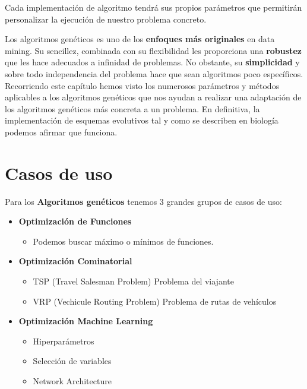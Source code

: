 \documentclass[
  a4paper,
  DIV=11,
  numbers=noendperiod]{scrreprt}
\providecommand{\tightlist}{%
  \setlength{\itemsep}{0pt}\setlength{\parskip}{0pt}}\usepackage{longtable,booktabs,array}
\begin{document}
Cada implementación de algoritmo tendrá sus propios parámetros que
permitirán personalizar la ejecución de nuestro problema concreto.

\begin{tcolorbox}[enhanced jigsaw, title=\textcolor{quarto-callout-important-color}{\faExclamation}\hspace{0.5em}{Recordad}, toprule=.15mm, breakable, opacityback=0, rightrule=.15mm, arc=.35mm, bottomrule=.15mm, toptitle=1mm, colframe=quarto-callout-important-color-frame, colbacktitle=quarto-callout-important-color!10!white, colback=white, coltitle=black, opacitybacktitle=0.6, bottomtitle=1mm, titlerule=0mm, leftrule=.75mm, left=2mm]

Los algoritmos genéticos es uno de los \textbf{enfoques más originales}
en data mining. Su sencillez, combinada con su flexibilidad les
proporciona una \textbf{robustez} que les hace adecuados a infinidad de
problemas. No obstante, su \textbf{simplicidad} y sobre todo
independencia del problema hace que sean algoritmos poco específicos.
Recorriendo este capítulo hemos visto los numerosos parámetros y métodos
aplicables a los algoritmos genéticos que nos ayudan a realizar una
adaptación de los algoritmos genéticos más concreta a un problema. En
definitiva, la implementación de esquemas evolutivos tal y como se
describen en biología podemos afirmar que funciona.

\end{tcolorbox}

\section{Casos de uso}\label{casos-de-uso-1}

Para los \textbf{Algoritmos genéticos} tenemos 3 grandes grupos de casos
de uso:

\begin{itemize}
\tightlist
\item
  \textbf{Optimización de Funciones}

  \begin{itemize}
  \tightlist
  \item
    Podemos buscar máximo o mínimos de funciones.
  \end{itemize}
\item
  \textbf{Optimización Cominatorial}

  \begin{itemize}
  \tightlist
  \item
    TSP (Travel Salesman Problem) Problema del viajante
  \item
    VRP (Vechicule Routing Problem) Problema de rutas de vehículos
  \end{itemize}
\item
  \textbf{Optimización Machine Learning}

  \begin{itemize}
  \tightlist
  \item
    Hiperparámetros
  \item
    Selección de variables
  \item
    Network Architecture
  \end{itemize}
\end{itemize}
\end{document}
